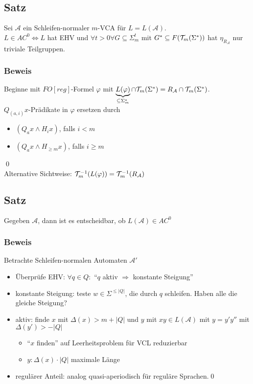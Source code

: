     \subsection{Satz}
        Sei $\mathcal{A}$ ein Schleifen-normaler $m$-VCA für $L=L(\mathcal{A})$.\\
        $L\in AC^0\Leftrightarrow L$ hat EHV und $\forall t>0\forall G\subseteq\Sigma_m^t$ mit $G^*\subseteq F(\mathcal{T}_m(\Sigma^*))$ hat $\eta_{R_\mathcal{A}}$ nur triviale Teilgruppen.
        \subsubsection{Beweis}
            Beginne mit $FO[reg]$-Formel $\varphi$ mit $\underbrace{L(\varphi)}_{\subseteq\Sigma^*_m}\cap\mathcal{T}_m(\Sigma^*)=R_\mathcal{A}\cap\mathcal{T}_m(\Sigma^*)$.\\
            $Q_{(a,i)}x$-Prädikate in $\varphi$ ersetzen durch
            \begin{itemize}
                \item $(Q_ax\wedge H_ix)$, falls $i<m$
                \item $(Q_ax\wedge H_{\geq m}x)$, falls $i\geq m$
            \end{itemize}\qed\\
            Alternative Sichtweise: $\mathcal{T}_m^{-1}(L(\varphi))=\mathcal{T}_m^{-1}(R_\mathcal{A})$\\
    \subsection{Satz}
        Gegeben $\mathcal{A}$, dann ist es entscheidbar, ob $L(\mathcal{A})\in AC^0$
        \subsubsection{Beweis}
            Betrachte Schleifen-normalen Automaten $\mathcal{A}'$
            \begin{itemize}
                \item Überprüfe EHV: $\forall q\in Q:$ ``$q$ aktiv $\Rightarrow$ konstante Steigung''
                \item konstante Steigung: teste $w\in\Sigma^{\le|Q|}$, die durch $q$ schleifen. Haben alle die gleiche Steigung?
                \item aktiv: finde $x$ mit $\Delta(x)>m+|Q|$ und $y$ mit $xy\in L(\mathcal{A})$ mit $y=y'y''$ mit $\Delta(y')>-|Q|$
                \begin{itemize}
                    \item ``$x$ finden'' auf Leerheitsproblem für VCL reduzierbar
                    \item $y:\Delta(x)\cdot|Q|$ maximale Länge
                \end{itemize}
                \item regulärer Anteil: analog quasi-aperiodisch für reguläre Sprachen.\qed
            \end{itemize}
